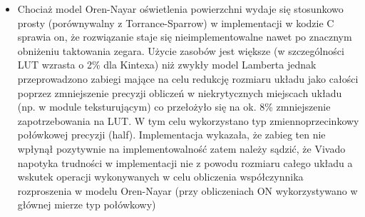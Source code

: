 \begin{itemize}
\item Chociaż model Oren-Nayar oświetlenia powierzchni wydaje się stosunkowo prosty (porównywalny z Torrance-Sparrow) w implementacji w kodzie C sprawia on, że rozwiązanie staje się nieimplementowalne nawet po znacznym obniżeniu taktowania zegara. Użycie zasobów jest większe (w szczególności LUT wzrasta o 2\% dla Kintexa) niż zwykły model Lamberta jednak przeprowadzono zabiegi mające na celu redukcję rozmiaru układu jako całości poprzez zmniejszenie precyzji obliczeń w niekrytycznych miejscach układu (np. w module teksturującym) co przełożyło się na ok. 8\% zmniejszenie zapotrzebowania na LUT. W tym celu wykorzystano typ zmiennoprzecinkowy połówkowej precyzji (half). Implementacja wykazała, że zabieg ten nie wpłynął pozytywnie na implementowalność zatem należy sądzić, że Vivado napotyka trudności w implementacji nie z powodu rozmiaru całego układu a wskutek operacji wykonywanych w celu obliczenia współczynnika rozproszenia w modelu Oren-Nayar (przy obliczeniach ON wykorzystywano w głównej mierze typ połówkowy)

\end{itemize}